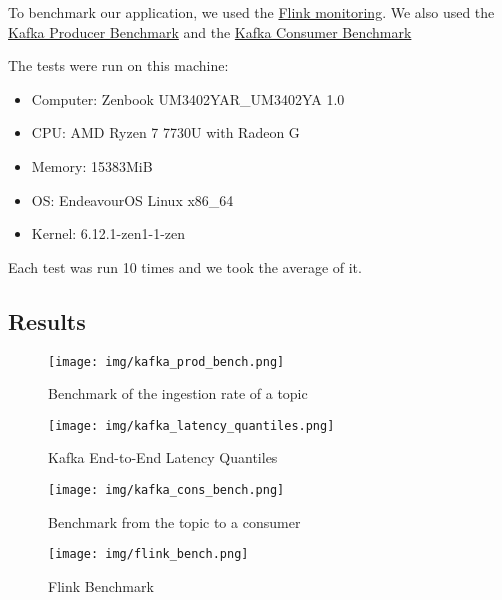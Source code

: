 \documentclass[utf8,9pt]{extarticle}
\begin{document}
\hspace{2 mm} To benchmark our application, we used the \href{https://flink.apache.org/2019/02/21/monitoring-apache-flink-applications-101/}{Flink monitoring}. We also used the \href{https://github.com/apache/kafka/blob/trunk/bin/kafka-producer-perf-test.sh}{Kafka Producer Benchmark} and the \href{https://github.com/apache/kafka/blob/trunk/bin/kafka-consumer-perf-test.sh}{Kafka Consumer Benchmark}

The tests were run on this machine:
\begin{itemize}
    \item Computer: Zenbook UM3402YAR\_UM3402YA 1.0
    \item CPU: AMD Ryzen 7 7730U with Radeon G
    \item Memory: 15383MiB
    \item OS: EndeavourOS Linux x86\_64
    \item Kernel: 6.12.1-zen1-1-zen
\end{itemize}

Each test was run 10 times and we took the average of it.


\subsection{Results}

\begin{figure}[H]
    \centering
    \texttt{[image: img/kafka\_prod\_bench.png]}
    \caption{Benchmark of the ingestion rate of a topic}
    \label{fig:kafka-benchmark}
\end{figure}

\begin{figure}[H]
    \centering
    \texttt{[image: img/kafka\_latency\_quantiles.png]}
    \caption{Kafka End-to-End Latency Quantiles}
    \label{fig:kafka_latency_quantiles}
\end{figure}

\begin{figure}[H]
    \centering
     \texttt{[image: img/kafka\_cons\_bench.png]}
     \caption{Benchmark from the topic to a consumer}
    \label{fig:kafka_cons_bench}
\end{figure}

\begin{figure}[H]
    \centering
    \texttt{[image: img/flink\_bench.png]}
    \caption{Flink Benchmark}
    \label{fig:flink-benchmark}
\end{figure}
\end{document}

